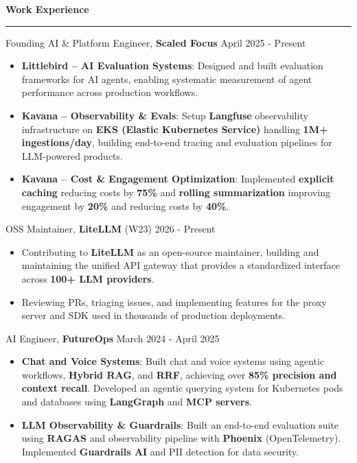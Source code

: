\documentclass{article}%
\begin{document}
\vspace{2mm}
\begin{flushleft}
\bf{\Large{Work Experience}}
\end{flushleft}
\vspace{-2mm}
\noindent\rule{\textwidth}{0.4pt}
\vspace{2mm}
Founding AI \& Platform Engineer, \textbf{Scaled Focus} \hfill{April 2025 - Present}
\vspace{-1mm}
\begin{itemize}
\setlength\itemsep{0.01em}
\item \textbf{Littlebird -- AI Evaluation Systems}: Designed and built evaluation frameworks for AI agents, enabling systematic measurement of agent performance across production workflows.
\item \textbf{Kavana -- Observability \& Evals}: Setup \textbf{Langfuse} observability infrastructure on \textbf{EKS (Elastic Kubernetes Service)} handling \textbf{1M+ ingestions/day}, building end-to-end tracing and evaluation pipelines for LLM-powered products.
\item \textbf{Kavana -- Cost \& Engagement Optimization}: Implemented \textbf{explicit caching} reducing costs by \textbf{75\%} and \textbf{rolling summarization} improving engagement by \textbf{20\%} and reducing costs by \textbf{40\%}.
\end{itemize}
\vspace{-1mm}
OSS Maintainer, \textbf{LiteLLM} (W23) \hfill{2026 - Present}
\vspace{-1mm}
\begin{itemize}
\setlength\itemsep{0.01em}
\item Contributing to \textbf{LiteLLM} as an open-source maintainer, building and maintaining the unified API gateway that provides a standardized interface across \textbf{100+ LLM providers}.
\item Reviewing PRs, triaging issues, and implementing features for the proxy server and SDK used in thousands of production deployments.
\end{itemize}
\vspace{-1mm}
AI Engineer, \textbf {FutureOps} \hfill{March 2024 - April 2025}
\vspace{-1mm}
\begin{itemize}
\setlength\itemsep{0.01em}
\item \textbf{Chat and Voice Systems}: Built chat and voice systems using agentic workflows, \textbf{Hybrid RAG}, and \textbf{RRF}, achieving over \textbf{85\% precision and context recall}. Developed an agentic querying system for Kubernetes pods and databases using \textbf{LangGraph} and \textbf{MCP servers}.
\item \textbf{LLM Observability \& Guardrails}: Built an end-to-end evaluation suite using \textbf{RAGAS} and observability pipeline with \textbf{Phoenix} (OpenTelemetry). Implemented \textbf{Guardrails AI} and PII detection for data security.
\end{itemize}
\end{document}
